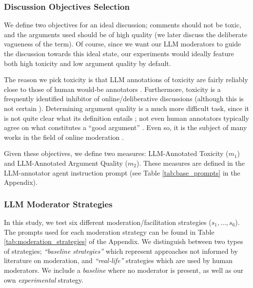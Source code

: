 \subsubsection{Discussion Objectives Selection}

We define two objectives for an ideal discussion; comments should not be toxic, and the arguments used should be of high quality (we later discuss the deliberate vagueness of the term). Of course, since we want our \ac{LLM} moderators to guide the discussion towards this ideal state, our experiments would ideally feature both high toxicity and low argument quality by default. 

The reason we pick toxicity is that \ac{LLM} annotations of toxicity are fairly reliably close to those of human would-be annotators \citep{kang-qian-2024-implanting, Wang2022ToxicityDW, anjum2024hate}. Furthermore, toxicity is a frequently identified inhibitor of online/deliberative discussions \citep{dekock2022disagree, XiaToxicity} (although this is not certain \citep{Avalle2024PersistentIP}). Determining argument quality is a much more difficult task, since it is not quite clear what its definition entails \cite{korre2025evaluation}; not even human annotators typically agree on what constitutes a “good argument” \cite{argyle2023}. Even so, it is the subject of many works in the field of online moderation \cite{argyle2023, schroeder-etal-2024-fora, falk-etal-2024-moderation, falk-etal-2021-predicting}.

Given these objectives, we define two measures: \ac{LLM}-Annotated Toxicity ($m_1$) and \ac{LLM}-Annotated Argument Quality ($m_2$). These measures are defined in the \ac{LLM}-annotator agent instruction prompt (see Table \ref{tab:base_prompts} in the Appendix).

\subsubsection{LLM Moderator Strategies}
\label{ssec:setup:strategies}

In this study, we test six different moderation/facilitation strategies ($s_1, \ldots, s_6$). The prompts used for each moderation strategy can be found in Table \ref{tab:moderation_strategies} of the Appendix. We distinguish between two types of strategies; \emph{“baseline strategies”} which represent approaches not informed by literature on moderation, and \emph{“real-life”} strategies which are used by human moderators. We include a \emph{baseline} where no moderator is present, as well as our own \emph{experimental} strategy.

